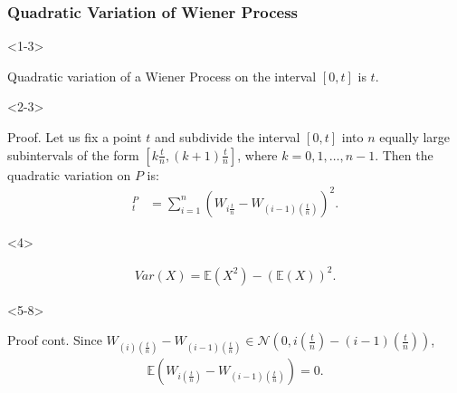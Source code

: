 \documentclass[10pt]{beamer}
\begin{document}
\begin{frame}[t]
  \frametitle{Quadratic Variation of Wiener Process}
    \begin{onlyenv}<1-3>
    \begin{theorem}
      Quadratic variation of a Wiener Process on the interval $[0,t]$ is $t$.
    \end{theorem}
    \end{onlyenv}
    \begin{onlyenv}<2-3>
      \begin{block}{Proof.}
        Let us fix a point $t$ and subdivide the interval $[0,t]$ into $n$ equally large subintervals of the form $[k\frac{t}{n}, (k+1)\frac{t}{n}]$, where $k = 0,1,\ldots,n-1$. Then the quadratic variation on $P$ is:
        \begin{align*}
          [W]^{P}_{t} &= \displaystyle\sum_{i = 1}^{n}(W_{i\frac{t}{n}} - W_{(i-1)(\frac{t}{n})})^2 .
        \end{align*}
      \end{block}
    \end{onlyenv}
    \begin{onlyenv}<4>
        \begin{theorem}
          \begin{align*}
            Var(X) = \mathbb{E}(X^2) - (\mathbb{E}(X))^2.
          \end{align*}
        \end{theorem}
    \end{onlyenv}
    \begin{onlyenv}<5-8>
      \begin{block}{Proof cont.}
        Since $W_{(i)(\frac{t}{n})} - W_{(i-1)(\frac{t}{n})} \in \mathcal{N}(0, i(\frac{t}{n}) - (i-1)(\frac{t}{n}))$, 
        \begin{align*}
          \mathbb{E}(W_{i(\frac{t}{n})} - W_{(i-1)(\frac{t}{n})}) = 0.
        \end{align*}
\end{block}
\end{onlyenv}
\end{frame}
\end{document}

